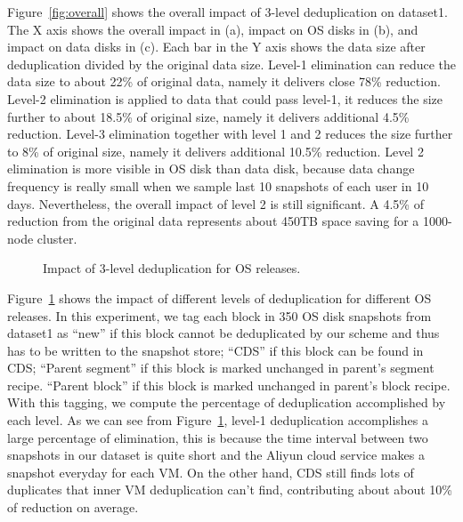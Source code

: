 Figure~\ref{fig:overall} shows the overall impact of 3-level deduplication on dataset1.
The X axis shows the overall impact in (a),  impact on OS disks in (b), and impact on data disks in (c).
Each bar in the Y axis shows the data size after deduplication divided by the original data size.
Level-1 elimination can reduce the data size to about 22\% of original data, namely it delivers close 78\% reduction.
Level-2 elimination is applied to data that could pass level-1, it
reduces the size further to about 18.5\% of original size, namely it delivers additional 4.5\% reduction.
Level-3 elimination together with level 1 and 2
reduces the size further to 8\% of original size, namely it delivers additional 10.5\% reduction.
Level 2 elimination is more visible in OS disk than data disk, because data change frequency is really small
when we sample last 10 snapshots of each user in 10 days. Nevertheless, the overall impact of level 2 is still significant.
A 4.5\% of reduction from the original data represents about 450TB space saving for a 1000-node cluster.


\begin{figure}
  \centering
  \caption{Impact of 3-level deduplication for OS releases.}
  \label{fig:oscds}
\end{figure}

Figure~\ref{fig:oscds} shows the impact of different levels of deduplication for different OS releases.
In this experiment, we tag each block in 350 OS disk snapshots from dataset1 as  ``new''
if this block cannot be deduplicated by our scheme and thus has to be written to the snapshot store;
``CDS''  if this block can be found  in CDS;
``Parent segment'' if  this block is marked unchanged in parent's segment recipe.
``Parent block'' if  this block is marked unchanged in parent's block recipe.
With this tagging, we compute the percentage of deduplication accomplished by each level.
As we can see from Figure~\ref{fig:oscds}, level-1 deduplication accomplishes a large percentage of elimination,
this is because the time interval between two snapshots in our dataset
is quite short and the Aliyun cloud service makes a snapshot  everyday  for each VM.
On the other hand,  CDS still finds lots of duplicates that inner VM deduplication can't find,
contributing about about 10\% of reduction on average.

